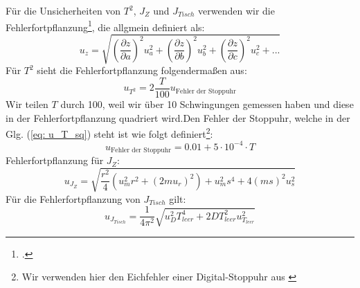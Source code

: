 \documentclass[bibliography=totocnumbered]{scrartcl}
\begin{document}
	Für die Unsicherheiten von $ T^{2} $, $ J_{Z} $ und  $ J_{Tisch} $ verwenden wir die Fehlerfortpflanzung\footcite[vgl][8]{Eichler.2016}, die allgmein definiert als:
	\begin{equation}\label{eq: Fehlerfortpflanzung}
		u_{z}=\sqrt{\left(\dfrac{\partial z}{\partial a}\right)^{2}u_{a}^{2}+\left(\dfrac{\partial z}{\partial b}\right)^{2}u_{b}^{2}+\left(\dfrac{\partial z}{\partial c}\right)^{2}u_{c}^{2}+...}
	\end{equation}
	Für $ T^{2} $ sieht die Fehlerfortpflanzung folgendermaßen aus:
	\begin{equation}\label{eq: u_T_sq}
		u_{T^{2}}=2\dfrac{T}{100}u_{\text{Fehler der Stoppuhr}}
	\end{equation}
	Wir teilen $ T $ durch 100, weil wir über 10 Schwingungen gemessen haben und diese in der Fehlerfortpflanzung quadriert wird.Den Fehler der Stoppuhr, welche in der Glg. (\ref{eq: u_T_sq}) steht ist wie folgt definiert\footnote{Wir verwenden hier den Eichfehler einer Digital-Stoppuhr aus \smartcite[vgl][18]{MullerPG.2007b}}:
	\begin{equation}\label{eq: Fehler Stoppuhr}
		u_{\text{Fehler der Stoppuhr}}=0.01+5\cdot 10^{-4}\cdot T
	\end{equation}
	Fehlerfortpflanzung für $ J_{Z} $:
	\begin{equation}\label{eq: u_J_Z}
		u_{J_{Z}}=\sqrt{\frac{r^{2}}{4}(u_{m}^{2} r^{2}+(2 m   u_{r})^{2})+u_{m}^{2}s^{4}+4(ms)^{2}u_{s}^{2}}
	\end{equation}
	Für die Fehlerfortpflanzung von $ J_{Tisch} $ gilt:
	\begin{equation}\label{eq: J_tisch}
		u_{J_{Tisch}}=\frac{1}{4\pi^{2}}\sqrt{u_{D}^{2}T^{4}_{leer}+2DT_{leer}^{2}u_{T_{leer}}^{2}}
	\end{equation}
	
	
\end{document}
